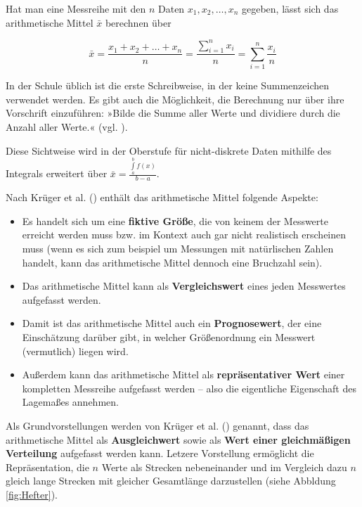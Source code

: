 \documentclass[
]{scrbook}
\providecommand{\tightlist}{%
  \setlength{\itemsep}{0pt}\setlength{\parskip}{0pt}}
\theoremstyle{definition}
\theoremstyle{definition}
\theoremstyle{definition}
\theoremstyle{definition}
\theoremstyle{remark}
\begin{document}
Hat man eine Messreihe mit den \(n\) Daten \(x_1,x_2,\ldots,x_n\) gegeben, lässt sich das arithmetische Mittel \(\bar{x}\) berechnen über

\[\bar{x} = \frac{x_1+x_2+\ldots + x_n}{n} = \frac{\sum\limits_{i=1}^n x_i}{n} = \sum_{i=1}^n \frac{x_i}{n}\]

In der Schule üblich ist die erste Schreibweise, in der keine Summenzeichen verwendet werden. Es gibt auch die Möglichkeit, die Berechnung nur über ihre Vorschrift einzuführen: »Bilde die Summe aller Werte und dividiere durch die Anzahl aller Werte.« (vgl. ).

Diese Sichtweise wird in der Oberstufe für nicht-diskrete Daten mithilfe des Integrals erweitert über \(\bar{x} = \frac{\int\limits_a^b f(x)}{b-a}\).

Nach Krüger et al. () enthält das arithmetische Mittel folgende Aspekte:

\begin{itemize}
\tightlist
\item
  Es handelt sich um eine \textbf{fiktive Größe}, die von keinem der Messwerte erreicht werden muss bzw. im Kontext auch gar nicht realistisch erscheinen muss (wenn es sich zum beispiel um Messungen mit natürlischen Zahlen handelt, kann das arithmetische Mittel dennoch eine Bruchzahl sein).
\item
  Das arithmetische Mittel kann als \textbf{Vergleichswert} eines jeden Messwertes aufgefasst werden.
\item
  Damit ist das arithmetische Mittel auch ein \textbf{Prognosewert}, der eine Einschätzung darüber gibt, in welcher Größenordnung ein Messwert (vermutlich) liegen wird.
\item
  Außerdem kann das arithmetische Mittel als \textbf{repräsentativer Wert} einer kompletten Messreihe aufgefasst werden -- also die eigentliche Eigenschaft des Lagemaßes annehmen.
\end{itemize}

Als \textcolor{semanticColor}{Grundvorstellungen} werden von Krüger et al. () genannt, dass das arithmetische Mittel als \textbf{Ausgleichwert} sowie als \textbf{Wert einer gleichmäßigen Verteilung} aufgefasst werden kann. Letzere Vorstellung ermöglicht die Repräsentation, die \(n\) Werte als Strecken nebeneinander und im Vergleich dazu \(n\) gleich lange Strecken mit gleicher Gesamtlänge darzustellen (siehe Abbldung \ref{fig:Hefter}).
\end{document}
